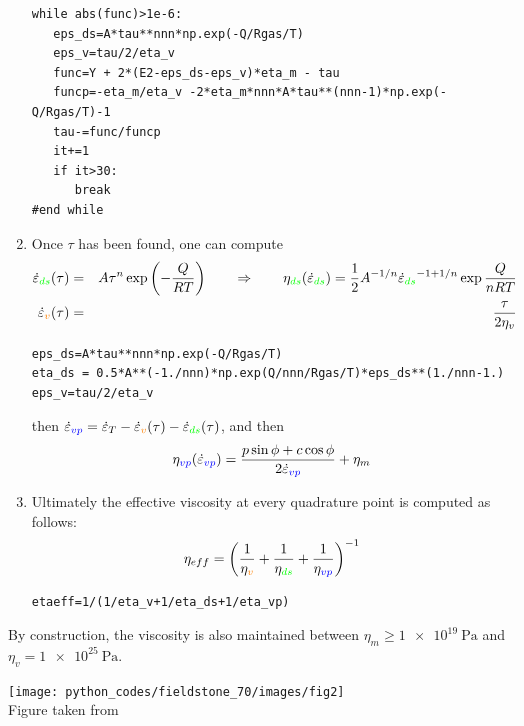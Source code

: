 \begin{enumerate}
\begin{lstlisting}
while abs(func)>1e-6:
   eps_ds=A*tau**nnn*np.exp(-Q/Rgas/T)
   eps_v=tau/2/eta_v
   func=Y + 2*(E2-eps_ds-eps_v)*eta_m - tau
   funcp=-eta_m/eta_v -2*eta_m*nnn*A*tau**(nnn-1)*np.exp(-Q/Rgas/T)-1
   tau-=func/funcp
   it+=1
   if it>30:
      break
#end while
\end{lstlisting}

\item Once $\tau$ has been found, one can compute 
\begin{eqnarray}
\dot{\varepsilon}_{\color{green}ds}(\tau)&=&A \tau^n \exp \left(-\frac{Q}{RT}\right)
\qquad 
\Rightarrow 
\qquad 
\eta_{\color{green}ds}(\dot\varepsilon_{\color{green}ds}) 
= \frac{1}{2} A^{-1/n} \dot{\varepsilon}_{\color{green}ds}^{-1+1/n} \exp \frac{Q}{nRT} \nonumber\\
\dot{\varepsilon}_{\color{orange}v}(\tau)&=&\frac{\tau}{2\eta_v}  \nonumber
\end{eqnarray}
\begin{lstlisting}
eps_ds=A*tau**nnn*np.exp(-Q/Rgas/T)
eta_ds = 0.5*A**(-1./nnn)*np.exp(Q/nnn/Rgas/T)*eps_ds**(1./nnn-1.)
eps_v=tau/2/eta_v
\end{lstlisting}
then 
$\dot{\varepsilon}_{\color{blue}vp}
=\dot{\varepsilon}_T 
-\dot{\varepsilon}_{\color{orange}v}(\tau) 
-\dot{\varepsilon}_{\color{green}ds}(\tau)$,
and then 
\[
\eta_{\color{blue} vp}(\dot\varepsilon_{\color{blue} vp}) 
= \frac{p \sin \phi + c \cos \phi}{2 \dot{\varepsilon}_{\color{blue}vp}}  + \eta_{m}
\]
\item 
Ultimately the effective viscosity at every quadrature point is computed as follows:
\[
\eta_{eff} = \left(
\frac{1}{\eta_{\color{orange}v}} + 
\frac{1}{\eta_{\color{green}ds}}  + 
\frac{1}{\eta_{\color{blue}vp}}  
\right)^{-1}
\]
\begin{lstlisting}
etaeff=1/(1/eta_v+1/eta_ds+1/eta_vp)
\end{lstlisting}

\end{enumerate}

 
By construction, the viscosity is also maintained between $\eta_{m}\ge \SI{1e19}{\pascal}$ 
and $\eta_{v}=\SI{1e25}{\pascal}$. 

\begin{center}
\texttt{[image: python\_codes/fieldstone\_70/images/fig2]}\\
{\captionfont Figure taken from \cite{dudy20}}
\end{center}

